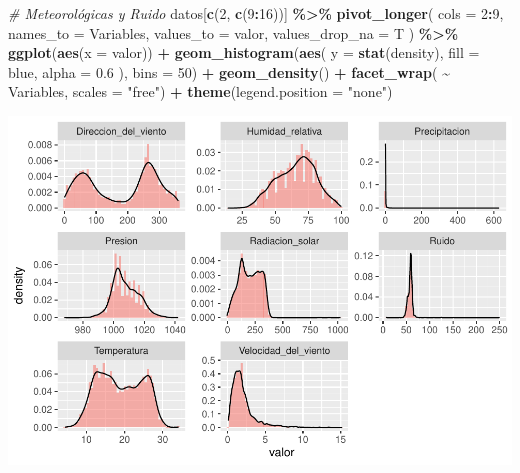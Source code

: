 \documentclass[notspecified,article,submit,moreauthors,pdftex]{Definitions/mdpi}
\newenvironment{Shaded}{\begin{snugshade}}{\end{snugshade}}
\newcommand{\AttributeTok}[1]{\textcolor[rgb]{0.13,0.29,0.53}{#1}}
\newcommand{\CommentTok}[1]{\textcolor[rgb]{0.56,0.35,0.01}{\textit{#1}}}
\newcommand{\DecValTok}[1]{\textcolor[rgb]{0.00,0.00,0.81}{#1}}
\newcommand{\FloatTok}[1]{\textcolor[rgb]{0.00,0.00,0.81}{#1}}
\newcommand{\FunctionTok}[1]{\textcolor[rgb]{0.13,0.29,0.53}{\textbf{#1}}}
\newcommand{\NormalTok}[1]{#1}
\newcommand{\SpecialCharTok}[1]{\textcolor[rgb]{0.81,0.36,0.00}{\textbf{#1}}}
\newcommand{\StringTok}[1]{\textcolor[rgb]{0.31,0.60,0.02}{#1}}
\begin{document}
\begin{Shaded}
\begin{Highlighting}[]
\CommentTok{\# Meteorológicas y Ruido}
\NormalTok{datos[}\FunctionTok{c}\NormalTok{(}\DecValTok{2}\NormalTok{, }\FunctionTok{c}\NormalTok{(}\DecValTok{9}\SpecialCharTok{:}\DecValTok{16}\NormalTok{))] }\SpecialCharTok{\%\textgreater{}\%}
  \FunctionTok{pivot\_longer}\NormalTok{(}
    \AttributeTok{cols =} \DecValTok{2}\SpecialCharTok{:}\DecValTok{9}\NormalTok{,}
    \AttributeTok{names\_to =} \StringTok{\textquotesingle{}Variables\textquotesingle{}}\NormalTok{,}
    \AttributeTok{values\_to =} \StringTok{\textquotesingle{}valor\textquotesingle{}}\NormalTok{,}
    \AttributeTok{values\_drop\_na =}\NormalTok{ T}
\NormalTok{  ) }\SpecialCharTok{\%\textgreater{}\%}
  \FunctionTok{ggplot}\NormalTok{(}\FunctionTok{aes}\NormalTok{(}\AttributeTok{x =}\NormalTok{ valor)) }\SpecialCharTok{+}
  \FunctionTok{geom\_histogram}\NormalTok{(}\FunctionTok{aes}\NormalTok{(}
    \AttributeTok{y =} \FunctionTok{stat}\NormalTok{(density),}
    \AttributeTok{fill =} \StringTok{\textquotesingle{}blue\textquotesingle{}}\NormalTok{,}
    \AttributeTok{alpha =} \FloatTok{0.6}
\NormalTok{  ), }\AttributeTok{bins =} \DecValTok{50}\NormalTok{) }\SpecialCharTok{+}
  \FunctionTok{geom\_density}\NormalTok{() }\SpecialCharTok{+}
  \FunctionTok{facet\_wrap}\NormalTok{( }\SpecialCharTok{\textasciitilde{}}\NormalTok{ Variables, }\AttributeTok{scales =} \StringTok{"free"}\NormalTok{) }\SpecialCharTok{+}
  \FunctionTok{theme}\NormalTok{(}\AttributeTok{legend.position =} \StringTok{"none"}\NormalTok{)}
\end{Highlighting}
\end{Shaded}

\includegraphics{Memoria_files/figure-latex/unnamed-chunk-15-1.pdf}
\end{document}
